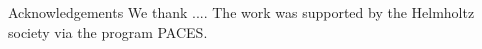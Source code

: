 \begin{section}{Acknowledgements}
We thank  ....
The work was supported by the Helmholtz society via the program PACES.
\end{section}
\begin{comment}
\begin{subsection}{Adoption of the benthic diagenesis model OMEXDIA}
\end{subsection}

\begin{subsection}{Set-ups and numerical experiments}
\end{subsection}

\begin{section}{RESULTS (standard runs)} 
\end{section}
\begin{normalsize}
\section*{Tables}
\begin{table}[ht] \caption{\footnotesize Relevant symbols used in the text. Abbrev: ESD: equivalent spherical diameter} \vspace{4mm}\label{tab:par} \small \begin{tabular}{llllll}\vspace{8mm} \hrule Symbol &Description&Value &Unit \\\vspace{8mm} \hrule
$f_R$ &Relative N in Rubisco & \\[0.0ex]
$\theta$ &CHL-a content in chloroplasts&2.5/0.14/4.8&g-CHL-a mol-C$^{-1}$\\[0.0ex]
$\imax$ &maximum ingestion rate &&h$^{-1}$\\[-1.3ex]
\vspace{8mm} \hrule \end{tabular} \end{table} 
\end{normalsize}

\end{comment}
